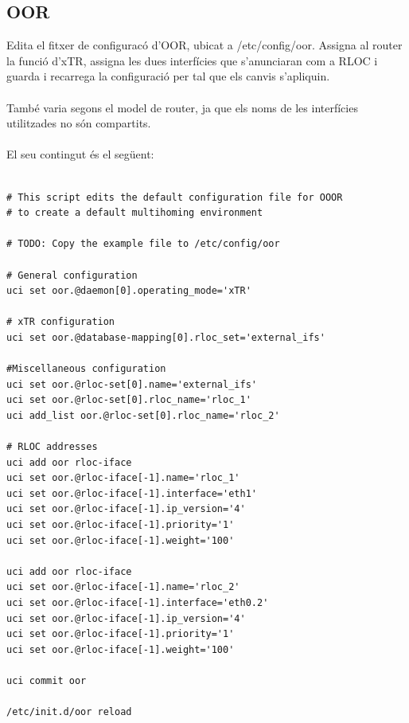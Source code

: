 \documentclass[11pt]{article}
\begin{document}
\subsection{OOR}
Edita el fitxer de configuracó d’OOR, ubicat a /etc/config/oor. Assigna al router la funció d’xTR, assigna les dues interfícies que s’anunciaran com a RLOC i guarda i recarrega la configuració per tal que els canvis s’apliquin.\\
\\
També varia segons el model de router, ja que els noms de les interfícies utilitzades no són compartits.\\
\\
El seu contingut és el següent:\\
\lstset{caption=Script de configuració d'OOR: WNDR3800}
\begin{lstlisting}[frame=single]

# This script edits the default configuration file for OOOR
# to create a default multihoming environment

# TODO: Copy the example file to /etc/config/oor

# General configuration
uci set oor.@daemon[0].operating_mode='xTR'

# xTR configuration
uci set oor.@database-mapping[0].rloc_set='external_ifs'

#Miscellaneous configuration
uci set oor.@rloc-set[0].name='external_ifs'
uci set oor.@rloc-set[0].rloc_name='rloc_1'
uci add_list oor.@rloc-set[0].rloc_name='rloc_2'

# RLOC addresses
uci add oor rloc-iface
uci set oor.@rloc-iface[-1].name='rloc_1'
uci set oor.@rloc-iface[-1].interface='eth1'
uci set oor.@rloc-iface[-1].ip_version='4'
uci set oor.@rloc-iface[-1].priority='1'
uci set oor.@rloc-iface[-1].weight='100'

uci add oor rloc-iface
uci set oor.@rloc-iface[-1].name='rloc_2'
uci set oor.@rloc-iface[-1].interface='eth0.2'
uci set oor.@rloc-iface[-1].ip_version='4'
uci set oor.@rloc-iface[-1].priority='1'
uci set oor.@rloc-iface[-1].weight='100'

uci commit oor

/etc/init.d/oor reload
\end{lstlisting}
\newpage
\lstset{caption=Script de configuració d'OOR: WRT1200AC}
\end{document}
